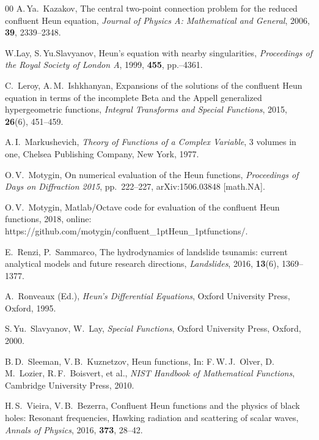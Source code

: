 \documentclass[11pt]{article}
\begin{document}
\begin{thebibliography}{00}
A.\,Ya.\ Kazakov, The central two-point connection problem for the reduced confluent Heun equation,
\textit{Journal of Physics A: Mathematical and General}, 2006, \textbf{39}, 2339--2348.

 W.\;Lay, S.\,Yu.\;Slavyanov, Heun's equation with
nearby singularities, \textit{Proceedings of the Royal Society of London A}, 1999, \textbf{455},
pp.--4361.

C.\ Leroy, A.\,M.\ Ishkhanyan, Expansions of the solutions of the confluent Heun equation in terms of the incomplete Beta and the Appell generalized
hypergeometric functions, \textit{Integral Transforms and Special Functions}, 2015, \textbf{26}(6), 451--459.

 A.\,I.\ Markushevich, \emph{Theory of Functions of a
Complex Variable}, 3 volumes in one, Chelsea Publishing Company, New York, 1977.

 O.\,V.\ Motygin, 
On numerical evaluation of the Heun functions, \textit{Proceedings of Days on Diffraction 2015}, pp.~222--227,
arXiv:1506.03848 [math.NA]. 


 O.\,V.\ Motygin, Matlab/Octave code for evaluation of the confluent Heun
functions, 2018, online:
https://github.com/motygin/confluent{\LARGE\_}\kern1ptHeun{\LARGE\_}\kern1ptfunctions/.

 E.\ Renzi, P.\ Sammarco, The hydrodynamics of landslide tsunamis: current analytical models and future research directions, \textit{Landslides}, 2016, \textbf{13}(6), 1369--1377.

 A.\ Ronveaux (Ed.), \emph{Heun's Differential
Equations}, Oxford University Press, Oxford, 1995.

 S.\,Yu.\ Slavyanov, W.\ Lay, \emph{Special Functions},
Oxford University Press, Oxford, 2000.

 B.\,D.\ Sleeman, V.\,B.\ Kuznetzov,  Heun functions,
In: F.\,W.\,J.~Olver, D.\,M.~Lozier, R.\,F.~Boisvert, et al., \emph{NIST
Handbook of Mathematical Functions}, Cambridge University Press, 2010.

H.\,S.\ Vieira, V.\,B.\ Bezerra,
Confluent Heun functions and the physics of black holes: Resonant frequencies, Hawking radiation and scattering of scalar waves,
\textit{Annals of Physics}, 2016, \textbf{373},
28--42.


\end{thebibliography}
\end{document}
